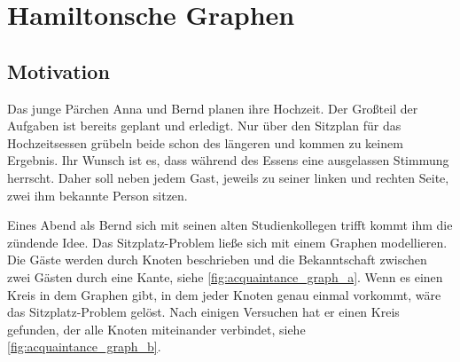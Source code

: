 \documentclass{article}
\newtheorem{mydef}{Definition}
\begin{document}



%
%
%
\section{Hamiltonsche Graphen}


%
%
%
\subsection{Motivation}

Das junge Pärchen Anna und Bernd planen ihre Hochzeit. Der Großteil der Aufgaben ist bereits geplant und erledigt. Nur über den Sitzplan für das Hochzeitsessen grübeln beide schon des längeren und kommen zu keinem Ergebnis. Ihr Wunsch ist es, dass während des Essens eine ausgelassen Stimmung herrscht. Daher soll neben jedem Gast, jeweils zu seiner linken und rechten Seite, zwei ihm bekannte Person sitzen.

Eines Abend als Bernd sich mit seinen alten Studienkollegen trifft kommt ihm die zündende Idee. Das Sitzplatz-Problem ließe sich mit einem Graphen modellieren. Die Gäste werden durch Knoten beschrieben und die Bekanntschaft zwischen zwei Gästen durch eine Kante, siehe \autoref{fig:acquaintance_graph_a}. Wenn es einen Kreis in dem Graphen gibt, in dem jeder Knoten genau einmal vorkommt, wäre das Sitzplatz-Problem gelöst. Nach einigen Versuchen hat er einen Kreis gefunden, der alle Knoten miteinander verbindet, siehe \autoref{fig:acquaintance_graph_b}.
\end{document}
